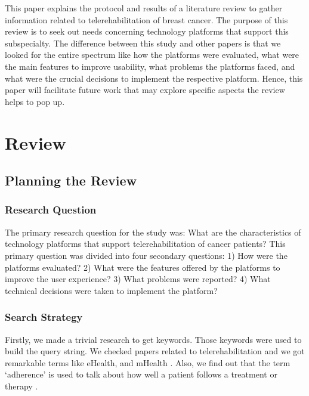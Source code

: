 \documentclass[conference]{IEEEtran}
\begin{document}
This paper explains the protocol and results of a literature review to gather information related to telerehabilitation of breast cancer. The purpose of this review is to seek out needs concerning technology platforms that support this subspecialty. The difference between this study and other papers is that we looked for the entire spectrum like how the platforms were evaluated, what were the main features to improve usability, what problems the platforms faced, and what were the crucial decisions to implement the respective platform. Hence, this paper will facilitate future work that may explore specific aspects the review helps to pop up.


\section{Review}

\subsection{Planning the Review}

\subsubsection{Research Question}
The primary research question for the study was: What are the characteristics of technology platforms that support telerehabilitation of cancer patients? This primary question was divided into four secondary questions: 1) How were the platforms evaluated? 2) What were the features offered by the platforms to improve the user experience? 3) What problems were reported? 4) What technical decisions were taken to implement the platform?

\subsubsection{Search Strategy}
Firstly, we made a trivial research to get keywords. Those keywords were used to build the query string. We checked papers related to telerehabilitation and we got remarkable terms like eHealth, and mHealth \cite{iacono_scoping_2016}. Also, we find out that the term `adherence' is used to talk about how well a patient follows a treatment or therapy \cite{JEMINIWA201959}.
\end{document}
